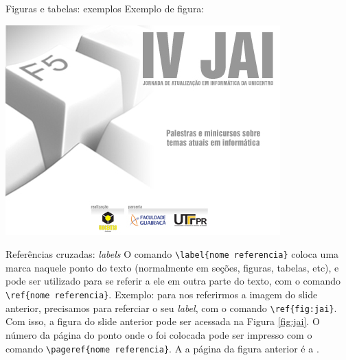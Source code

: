 \begin{frame}[fragile]{Figuras e tabelas: exemplos}
Exemplo de figura: \newline
\begin{center}
	\includegraphics[scale=1.00]{jai.jpg}
	\label{fig:jai}
\end{center}
\end{frame}

\begin{frame}[fragile]{Refer\^encias cruzadas: \emph{labels}}
O comando \verb|\label{nome referencia}| coloca uma marca naquele ponto do texto (normalmente em se{\c c}\~oes, figuras, tabelas, etc), e pode ser utilizado para se referir a ele em outra parte do texto, com o comando \verb|\ref{nome referencia}|.
\newline \newline
Exemplo: para nos referirmos a imagem do slide anterior, precisamos para referciar o seu \emph{label}, com o comando \verb|\ref{fig:jai}|. Com isso, a figura do slide anterior pode ser acessada na Figura \ref{fig:jai}.
\newline \newline
O n\'umero da p\'agina do ponto onde o  foi colocada pode ser impresso com o comando
\verb|\pageref{nome referencia}|. A a p\'agina da figura anterior \'e a \pageref{fig:jai}.
\end{frame}

